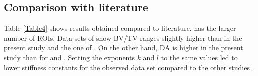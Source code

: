 \documentclass[a4paper,fleqn]{DC_ArtStyle}
\begin{document}
	\subsection{Comparison with literature}
	Table \ref{Table4} shows results obtained compared to literature. \citeauthor{Gross2013} \cite{Gross2013} has the larger number of ROIs. Data sets of \citeauthor{Panyasantisuk2015} \cite{Panyasantisuk2015} show BV/TV ranges slightly higher than in the present study and the one of \citeauthor{Gross2013} \cite{Gross2013}. On the other hand, DA is higher in the present study than for \citeauthor{Panyasantisuk2015} \cite{Panyasantisuk2015} and \citeauthor{Gross2013} \cite{Gross2013}. Setting the exponents $k$ and $l$ to the same values led to lower stiffness constants for the observed data set compared to the other studies \cite{Gross2013,Panyasantisuk2015}.\\
	
\end{document}
